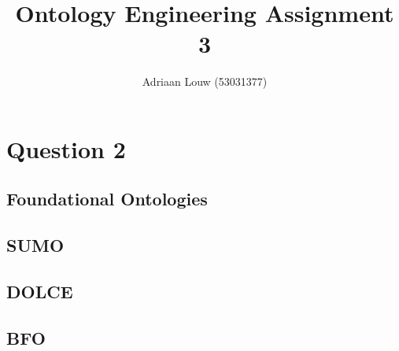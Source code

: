 \documentclass[12pt,a4paper]{article}
\title{Ontology Engineering Assignment 3}
\author{Adriaan Louw (53031377)}
\begin{document}
\section{Question 2}

\subsection{Foundational Ontologies}

\subsection{SUMO}
\citep{sumo}

\subsection{DOLCE}
\citep{dolce}

\subsection{BFO}


\end{document}
